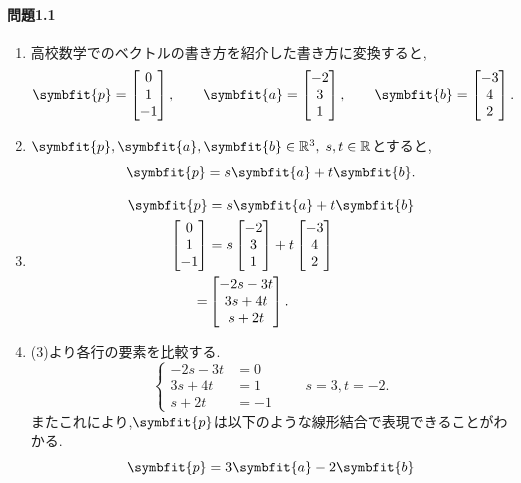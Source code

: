 \paragraph{問題1.1}
\begin{enumerate}[label=(\arabic*)]
    \item 高校数学でのベクトルの書き方を紹介した書き方に変換すると,
\[
    \symbfit{p} = \begin{bmatrix}
        0 \\ 1 \\ -1
    \end{bmatrix},\qquad
    \symbfit{a} = \begin{bmatrix}
        -2 \\ 3 \\ 1
    \end{bmatrix},\qquad
    \symbfit{b} = \begin{bmatrix}
        -3 \\ 4 \\ 2
    \end{bmatrix}.
\]

\item $\symbfit{p},\symbfit{a},\symbfit{b}\in \mathbb{R}^3,\;s,t \in \mathbb{R}$とすると,
\[\symbfit{p} = s\symbfit{a} + t\symbfit{b}. \]

\item 
\begin{align*}
    \symbfit{p} &= s\symbfit{a} + t\symbfit{b}\\
    \begin{bmatrix}
        0 \\ 1 \\ -1
    \end{bmatrix}
    &= s\begin{bmatrix}
        -2 \\ 3 \\ 1
    \end{bmatrix}+t
    \begin{bmatrix}
        -3 \\ 4 \\ 2
    \end{bmatrix}\\
    =&
    \begin{bmatrix}
        -2s-3t \\ 3s +4t \\ s+2t
    \end{bmatrix}.
\end{align*}
\item (3)より各行の要素を比較する.
\[
\begin{cases}
    -2s-3t &= 0 \\ 3s+4t &= 1 \\ s+2t &= -1
\end{cases}\qquad s=3,t=-2.
\]
またこれにより,\;$\symbfit{p}$は以下のような線形結合で表現できることがわかる.
\[\symbfit{p} = 3\symbfit{a} -2\symbfit{b} \]
\end{enumerate}
